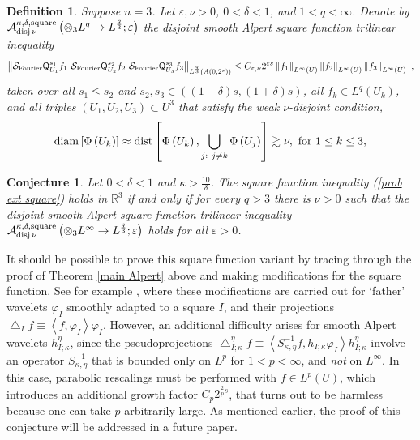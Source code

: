 \documentclass{amsart}%
\theoremstyle{plain}
\newtheorem{conjecture}[theorem]{Conjecture}
\newtheorem{definition}[theorem]{Definition}
\numberwithin{equation}{section}
\begin{document}
\begin{definition}
Suppose $n=3$. Let $\varepsilon,\nu>0$, $0<\delta<1$, and $1<q<\infty$. Denote
by $\mathcal{A}_{\mathop{\rm disj}\nu}^{\kappa,\delta,\mathop{\rm
square}}\left(  \otimes_{3}L^{q}\rightarrow L^{\frac{q}{3}};\varepsilon
\right)  $ the disjoint \emph{smooth Alpert square function }trilinear
inequality%
\[
\left\Vert \mathcal{S}_{\mathop{\rm Fourier}}\mathsf{Q}_{U_{1}}^{s_{1}}%
f_{1}\ \mathcal{S}_{\mathop{\rm Fourier}}\mathsf{Q}_{U_{2}}^{s_{2}}%
f_{2}\ \mathcal{S}_{\mathop{\rm Fourier}}\mathsf{Q}_{U_{3}}^{s_{3}}%
f_{3}\right\Vert _{L^{\frac{q}{3}}\left(  A\left(  0,2^{s}\right)  \right)
}\leq C_{\varepsilon,\nu}2^{\varepsilon s}\left\Vert f_{1}\right\Vert
_{L^{\infty}\left(  U\right)  }\left\Vert f_{2}\right\Vert _{L^{\infty}\left(
U\right)  }\left\Vert f_{3}\right\Vert _{L^{\infty}\left(  U\right)  }\ ,
\]
taken over all $s_{1}\leq s_{2}$ and $s_{2},s_{3}\in\left(  \left(
1-\delta\right)  s,\left(  1+\delta\right)  s\right)  $, all $f_{k}\in
L^{q}\left(  U_{k}\right)  $, and all triples $\left(  U_{1},U_{2}%
,U_{3}\right)  \subset U^{3}$ that satisfy the weak $\nu$-disjoint condition,%
\[
\mathop{\rm diam}\left[  \Phi\left(  U_{k}\right)  \right]  \approx
\mathop{\rm dist}\left[  \Phi\left(  U_{k}\right)  ,\bigcup_{j:\ j\neq k}%
\Phi\left(  U_{j}\right)  \right]  \gtrsim\nu,\text{ for }1\leq k\leq3,
\]

\end{definition}

\begin{conjecture}
\label{alternate}Let $0<\delta<1$ and $\kappa>\frac{10}{\delta}$. The square
function inequality (\ref{prob ext square}) holds in $\mathbb{R}^{3}$ \emph{if
and only if} for every $q>3$ there is $\nu>0$ such that the disjoint
\emph{smooth Alpert square function }trilinear inequality $\mathcal{A}%
_{\mathop{\rm disj}\nu}^{\kappa,\delta,\mathop{\rm square}}\left(  \otimes
_{3}L^{\infty}\rightarrow L^{\frac{q}{3}};\varepsilon\right)  $ holds for all
$\varepsilon>0$.
\end{conjecture}

It should be possible to prove this square function variant by tracing through
the proof of Theorem \ref{main Alpert} above and making modifications for the
square function. See for example \cite{RiSa2}, where these modifications are
carried out for `father' wavelets $\varphi_{I}$ smoothly adapted to a square
$I$, and their projections $\bigtriangleup_{I}f\equiv\left\langle
f,\varphi_{I}\right\rangle \varphi_{I}$. However, an additional difficulty
arises for smooth Alpert wavelets $h_{I;\kappa}^{\eta}$, since the
pseudoprojections $\bigtriangleup_{I;\kappa}^{\eta}f\equiv\left\langle
S_{\kappa,\eta}^{-1}f,h_{I;\kappa}\varphi_{I}\right\rangle h_{I;\kappa}^{\eta
}$ involve an operator $S_{\kappa,\eta}^{-1}$ that is bounded only on $L^{p}$
for $1<p<\infty$, and \emph{not} on $L^{\infty}$. In this case, parabolic
rescalings must be performed with $f\in L^{p}\left(  U\right)  $, which
introduces an additional growth factor $C_{p}2^{\frac{2}{p}s}$, that turns out
to be harmless because one can take $p$ arbitrarily large. As mentioned
earlier, the proof of this conjecture will be addressed in a future paper.
\end{document}
